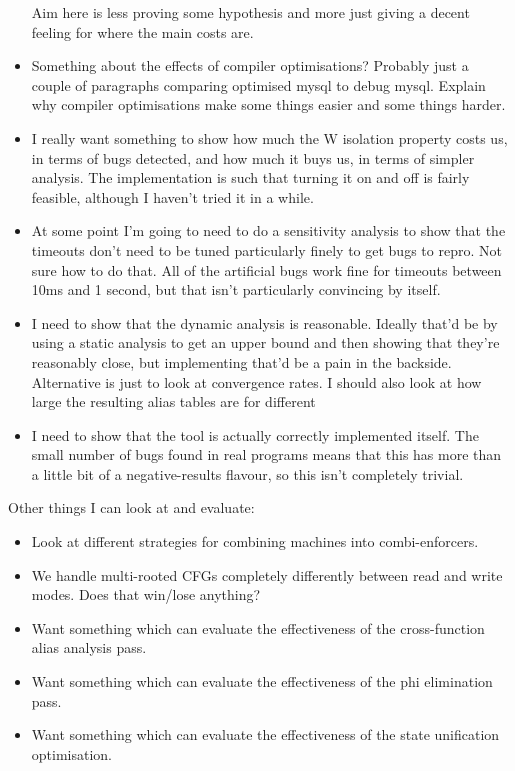 \begin{itemize}
  Aim here is less proving some hypothesis and more just giving a
  decent feeling for where the main costs are.
\item Something about the effects of compiler optimisations?  Probably
  just a couple of paragraphs comparing optimised mysql to debug
  mysql.  Explain why compiler optimisations make some things easier
  and some things harder.
\item I really want something to show how much the W isolation
  property costs us, in terms of bugs detected, and how much it buys
  us, in terms of simpler analysis.  The implementation is such that
  turning it on and off is fairly feasible, although I haven't tried
  it in a while.
\item At some point I'm going to need to do a sensitivity analysis to
  show that the timeouts don't need to be tuned particularly finely to
  get bugs to repro.  Not sure how to do that.  All of the artificial
  bugs work fine for timeouts between 10ms and 1 second, but that
  isn't particularly convincing by itself.
\item I need to show that the dynamic analysis is reasonable.  Ideally
  that'd be by using a static analysis to get an upper bound and then
  showing that they're reasonably close, but implementing that'd be a
  pain in the backside.  Alternative is just to look at convergence
  rates.  I should also look at how large the resulting alias tables
  are for different 
\item I need to show that the tool is actually correctly implemented
  itself.  The small number of bugs found in real programs means that
  this has more than a little bit of a negative-results flavour, so
  this isn't completely trivial.
\end{itemize}

Other things I can look at and evaluate:

\begin{itemize}
\item
  Look at different strategies for combining machines into
  combi-enforcers.
\item
  We handle multi-rooted CFGs completely differently between read and
  write modes.  Does that win/lose anything?
\item
  Want something which can evaluate the effectiveness of the
  cross-function alias analysis pass.
\item
  Want something which can evaluate the effectiveness of the phi
  elimination pass.
\item
  Want something which can evaluate the effectiveness of the state
  unification optimisation.
\end{itemize}

